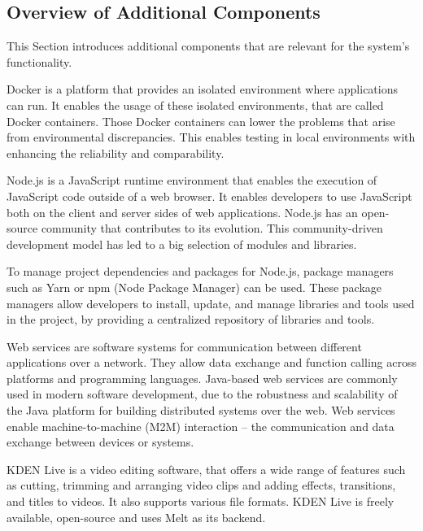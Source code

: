 \documentclass[../MasterThesis.tex]{subfiles}
\begin{document}
\subsection{Overview of Additional Components}
\label{subsection:overview_additional_components}


This Section introduces additional components that are relevant for the system's functionality.


Docker is a platform that provides an isolated environment where applications can run. It enables the usage of these isolated environments, that are called Docker containers.
Those Docker containers can lower the problems that arise from environmental discrepancies. This enables testing in local environments with enhancing the reliability and comparability.~\cite{docker}



Node.js is a JavaScript runtime environment that enables the execution of JavaScript code outside of a web browser.
It enables developers to use JavaScript both on the client and server sides of web applications. 
Node.js has an open-source community that contributes to its evolution. This community-driven development model has led to a big selection of modules and libraries.~\cite{nodejs, RM_Frontend, ap3_docs}


To manage project dependencies and packages for Node.js, package managers such as Yarn or npm (Node Package Manager) can be used. These package managers allow developers to install, update, and manage libraries and tools used in the project, by providing a centralized repository of libraries and tools.~\cite{RM_Frontend, npmyarn}



Web services are software systems for communication between different applications over a network. 
They allow data exchange and function calling across platforms and programming languages. 
Java-based web services are commonly used in modern software development, due to the robustness and scalability of the Java platform for building distributed systems over the web.
Web services enable machine-to-machine (M2M) interaction -- the communication and data exchange between devices or systems.~\cite{webservice}

KDEN Live is a video editing software, that offers a wide range of features such as cutting, trimming and arranging video clips and adding effects, transitions, and titles to videos. It also supports various file formats. KDEN Live is freely available, open-source and uses Melt as its backend.~\cite{kdenlive}
\end{document}
